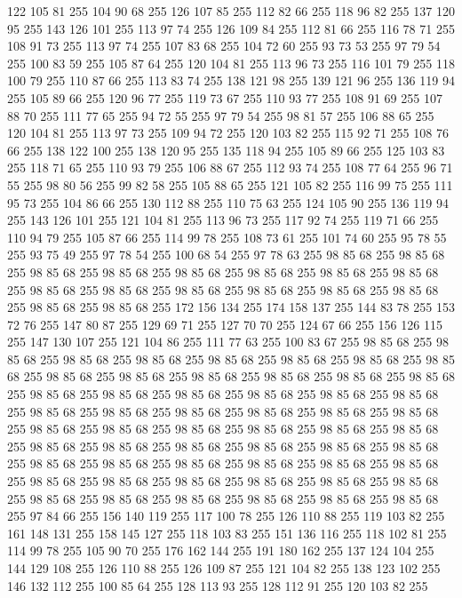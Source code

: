 122 105 81 255 104 90 68 255 126 107 85 255 112 82 66 255 118 96 82 255 137 120 95 255 143 126 101 255 113 97 74 255 126 109 84 255 112 81 66 255 116 78 71 255 108 91 73 255 113 97 74 255 107 83 68 255 104 72 60 255 93 73 53 255 97 79 54 255 100 83 59 255 105 87 64 255 120 104 81 255 113 96 73 255 116 101 79 255 118 100 79 255 110 87 66 255 113 83 74 255 138 121 98 255 139 121 96 255 136 119 94 255 105 89 66 255 120 96 77 255 119 73 67 255 110 93 77 255 108 91 69 255 107 88 70 255 111 77 65 255 94 72 55 255 97 79 54 255 98 81 57 255 106 88 65 255 120 104 81 255 113 97 73 255 109 94 72 255 120 103 82 255 115 92 71 255 108 76 66 255 138 122 100 255 138 120 95 255 135 118 94 255 105 89 66 255 125 103 83 255 118 71 65 255 110 93 79 255 106 88 67 255 112 93 74 255 108 77 64 255 96 71 55 255 98 80 56 255 99 82 58 255 105 88 65 255 121 105 82 255 116 99 75 255 111 95 73 255 104 86 66 255 130 112 88 255
110 75 63 255 124 105 90 255 136 119 94 255 143 126 101 255 121 104 81 255 113 96 73 255 117 92 74 255 119 71 66 255 110 94 79 255 105 87 66 255 114 99 78 255 108 73 61 255 101 74 60 255 95 78 55 255 93 75 49 255 97 78 54 255 100 68 54 255 97 78 63 255 98 85 68 255 98 85 68 255 98 85 68 255 98 85 68 255 98 85 68 255 98 85 68 255 98 85 68 255 98 85 68 255 98 85 68 255 98 85 68 255 98 85 68 255 98 85 68 255 98 85 68 255 98 85 68 255 98 85 68 255 98 85 68 255 172 156 134 255 174 158 137 255 144 83 78 255 153 72 76 255 147 80 87 255 129 69 71 255 127 70 70 255 124 67 66 255 156 126 115 255 147 130 107 255 121 104 86 255 111 77 63 255 100 83 67 255 98 85 68 255 98 85 68 255 98 85 68 255 98 85 68 255 98 85 68 255 98 85 68 255 98 85 68 255 98 85 68 255 98 85 68 255 98 85 68 255 98 85 68 255 98 85 68 255 98 85 68 255 98 85 68 255 98 85 68 255 98 85 68 255 98 85 68 255
98 85 68 255 98 85 68 255 98 85 68 255 98 85 68 255 98 85 68 255 98 85 68 255 98 85 68 255 98 85 68 255 98 85 68 255 98 85 68 255 98 85 68 255 98 85 68 255 98 85 68 255 98 85 68 255 98 85 68 255 98 85 68 255 98 85 68 255 98 85 68 255 98 85 68 255 98 85 68 255 98 85 68 255 98 85 68 255 98 85 68 255 98 85 68 255 98 85 68 255 98 85 68 255 98 85 68 255 98 85 68 255 98 85 68 255 98 85 68 255 98 85 68 255 98 85 68 255 98 85 68 255 98 85 68 255 98 85 68 255 98 85 68 255 98 85 68 255 98 85 68 255 98 85 68 255 97 84 66 255 156 140 119 255 117 100 78 255 126 110 88 255 119 103 82 255 161 148 131 255 158 145 127 255 118 103 83 255 151 136 116 255 118 102 81 255 114 99 78 255 105 90 70 255 176 162 144 255 191 180 162 255 137 124 104 255 144 129 108 255 126 110 88 255 126 109 87 255 121 104 82 255 138 123 102 255 146 132 112 255 100 85 64 255 128 113 93 255 128 112 91 255 120 103 82 255
